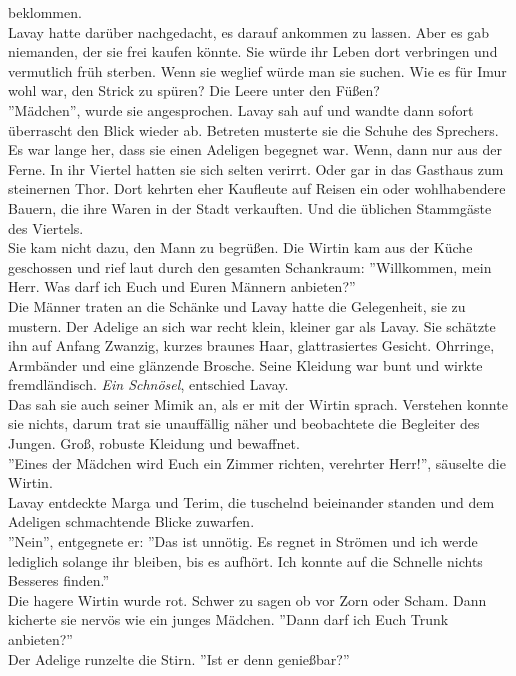 beklommen.\\ Lavay hatte darüber nachgedacht, es darauf ankommen zu lassen. Aber es gab niemanden, 
der sie frei kaufen könnte. Sie würde ihr Leben dort verbringen und vermutlich früh sterben. Wenn 
sie weglief würde man sie suchen. Wie es für Imur wohl war, den Strick zu spüren? Die Leere unter 
den Füßen?\\
''Mädchen'', wurde sie angesprochen.
Lavay sah auf und wandte dann sofort überrascht den Blick wieder ab. Betreten musterte sie die 
Schuhe des Sprechers. Es war lange her, dass sie einen Adeligen begegnet war. Wenn, dann nur aus 
der Ferne. In ihr Viertel hatten sie sich selten verirrt. Oder gar in das Gasthaus zum steinernen 
Thor. Dort kehrten eher Kaufleute auf Reisen ein oder wohlhabendere Bauern, die ihre Waren in der 
Stadt verkauften. Und die üblichen Stammgäste des Viertels.\\
Sie kam nicht dazu, den Mann zu begrüßen. Die Wirtin kam aus der Küche geschossen und rief laut 
durch den gesamten Schankraum: ''Willkommen, mein Herr. Was darf ich Euch und Euren Männern 
anbieten?''\\
Die Männer traten an die Schänke und Lavay hatte die Gelegenheit, sie zu mustern. Der Adelige an 
sich war recht klein, kleiner gar als Lavay. Sie schätzte ihn auf Anfang Zwanzig, kurzes braunes 
Haar, glattrasiertes Gesicht. Ohrringe, Armbänder und eine glänzende Brosche. Seine Kleidung war 
bunt und wirkte fremdländisch. \textit{Ein Schnösel}, entschied Lavay.\\Das sah sie auch seiner 
Mimik an, als er mit der Wirtin sprach. Verstehen konnte sie nichts, darum trat sie unauffällig 
näher und beobachtete die Begleiter des Jungen. Groß, robuste Kleidung und bewaffnet.\\
''Eines der Mädchen wird Euch ein Zimmer richten, verehrter Herr!'', säuselte die Wirtin.\\
Lavay entdeckte Marga und Terim, die tuschelnd beieinander standen und dem Adeligen schmachtende 
Blicke zuwarfen. \\
''Nein'', entgegnete er: ''Das ist unnötig. Es regnet in Strömen und ich werde lediglich 
solange ihr bleiben, bis es aufhört. Ich konnte auf die Schnelle nichts Besseres finden.''\\
Die hagere Wirtin wurde rot. Schwer zu sagen ob vor Zorn oder Scham. Dann kicherte sie nervös wie 
ein junges Mädchen. ''Dann darf ich Euch Trunk anbieten?''\\
Der Adelige runzelte die Stirn. ''Ist er denn genießbar?''\\
